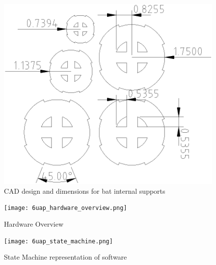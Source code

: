 \begin{figure}[htp]
\begin{center}
\vspace{0.4in}
\includegraphics[scale = 0.5]{supports.png}
\caption{CAD design and dimensions for bat internal supports}
\label{fig:supports}
\end{center}
\end{figure}
\clearpage
\newpage

\begin{figure}[htp]
\begin{center}
\vspace{0.4in}
\texttt{[image: 6uap\_hardware\_overview.png]}
\caption{Hardware Overview}
\label{fig:hardware_overview}
\end{center}
\end{figure}
\clearpage
\newpage

\begin{figure}[htp]
\begin{center}
\vspace{0.4in}
\texttt{[image: 6uap\_state\_machine.png]}
\caption{State Machine representation of software}
\label{fig:state_machine}
\end{center}
\end{figure}
\clearpage
\newpage

